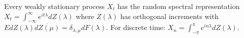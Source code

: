 Every weakly stationary process $X_t$ has the random spectral representation $X_t = \int_{-\infty}^\infty e^{it\lambda} dZ(\lambda)$ where $Z(\lambda)$ has orthogonal increments with $E dZ(\lambda) \overline{dZ(\mu)} = \delta_{\lambda,\mu} dF(\lambda)$. For discrete time: $X_n = \int_{-\pi}^\pi e^{in\lambda} dZ(\lambda)$.
